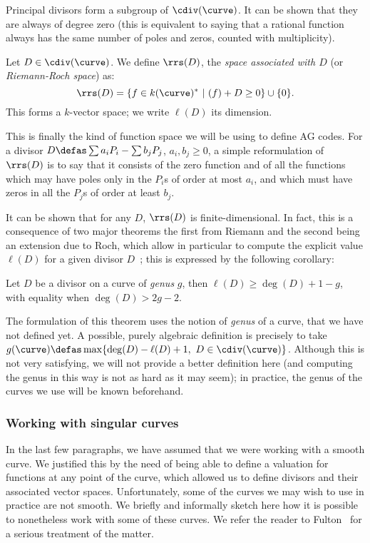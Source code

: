 Principal divisors form a subgroup of $\cdiv(\curve)$. It can be shown that they are always of degree zero
(this is equivalent to saying that a rational function always has the same number of poles and zeros, counted with
multiplicity).

\begin{defi}
Let $D \in \cdiv(\curve)$. We define $\rrs(D)$, the \emph{space associated with $D$} (or \emph{Riemann-Roch space}) as:
\[
\rrs(D) = \{f \in k(\curve)^*~|~(f) + D \geq 0\} \cup \{0\}.
\]
This forms a $k$-vector space; we write $\ell(D)$ its dimension.
\end{defi}

This is finally the kind of function space we will be using to define AG codes. For a divisor
$D \defas \sum a_iP_i - \sum b_jP_j$, $a_i, b_j \geq 0$, a simple reformulation of $\rrs(D)$ is to say that it consists of the zero function and of all the functions
which may have poles only in the $P_i$s of order at most $a_i$, and which must have zeros in all the $P_j$s of order
at least $b_j$.

It can be shown that for any $D$, $\rrs(D)$ is finite-dimensional. In fact, this is a consequence of two major theorems
the first from Riemann and the second being an extension due to Roch, which allow in particular to compute the explicit value $\ell(D)$
for a given divisor $D$~; this is expressed by the following corollary:

\begin{cor}
Let $D$ be a divisor on a curve of \emph{genus} $g$, then $\ell(D) \geq \deg(D) + 1 - g$, with equality
when $\deg(D) > 2g - 2$.
\end{cor}

The formulation of this theorem uses the notion of \emph{genus} of a curve, that we have not defined yet. A possible, purely algebraic definition is precisely to take
$g(\curve) \defas \max \{\deg(D) - \ell(D) + 1,~D \in \cdiv(\curve)\}$. Although this is not very satisfying, we will not provide a better definition here (and computing
the genus in this way is not as hard as it may seem); in practice, the genus
of the curves we use will be known beforehand.

\subsubsection{Working with singular curves}
\label{sec:nonsingmod}

In the last few paragraphs, we have assumed that we were working with a smooth curve. We justified this by the need of being able to define a valuation for functions
at any point of the curve, which allowed us to define divisors and their associated vector spaces.
Unfortunately, some of the curves we may wish to use in practice are not smooth. We briefly and informally sketch here how it is possible to nonetheless work with some
of these curves. We refer the reader to \eg Fulton~\cite[Chap. 7]{fulton} for a serious treatment of the matter.

